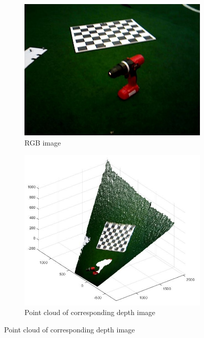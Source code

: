 \documentclass[letterpaper, 10 pt, conference]{ieeeconf}  %
\begin{document}
\begin{figure}
\begin{subfigure}[b]{0.5\textwidth}
	\centering
   \includegraphics[scale = 0.35]{rgb.jpg}
   \caption{RGB image}
   \label{fig:init} 
\end{subfigure}

\begin{subfigure}[b]{0.5\textwidth}
	\centering
   \includegraphics[scale =0.35]{depth.jpg}
   \caption{Point cloud of corresponding depth image}
   \label{fig:mean}
\end{subfigure}


\end{figure}
\end{document}
